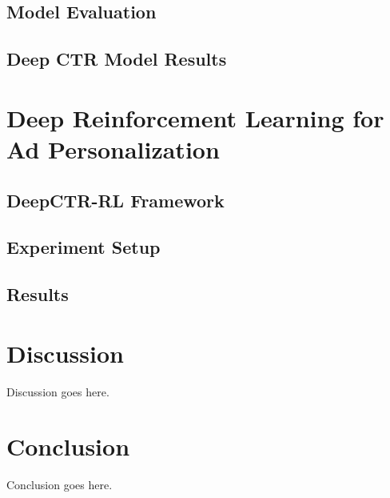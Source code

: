 \documentclass{mldsmsc}
\begin{document}
\section{Model Evaluation}

\section{Deep CTR Model Results}

\chapter{Deep Reinforcement Learning for Ad Personalization}

\section{DeepCTR-RL Framework}

\section{Experiment Setup}

\section{Results}

\chapter{Discussion}

Discussion goes here.

\chapter{Conclusion}


Conclusion goes here. 





\clearpage
\renewcommand*{\thepage}{A\arabic{page}}

%
%




\end{document}
